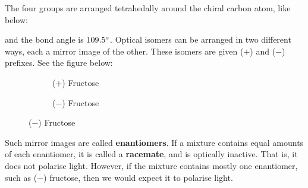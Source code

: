 \documentclass{paper}
\begin{document}
The four groups are arranged tetrahedally around the chiral carbon atom, like below:

\begin{figure}[H]


\end{figure}

and the bond angle is $109.5 \degree$. Optical isomers can be arranged in two different ways, each a mirror image of the other. These isomers are given ($+$) and ($-$) prefixes. See the figure below:

\begin{figure}[H]
\label{fig:fructose-optical-isomers}
\caption{Optical isomers of fructose}

\begin{subfigure}[H]{.49\textwidth}
\caption{($+$) Fructose}
\centering
{}
\end{subfigure}
\begin{subfigure}[H]{.49\textwidth}
\caption{($-$) Fructose}
\centering
{}
\end{subfigure}
\end{figure}

Such mirror images are called \textbf{enantiomers}. If a mixture contains equal amounts of each enantiomer, it is called a \textbf{racemate}, and is optically inactive. That is, it does not polarise light. However, if the mixture contains mostly one enantiomer, such as ($-$) fructose, then we would expect it to polarise light.
\end{document}
